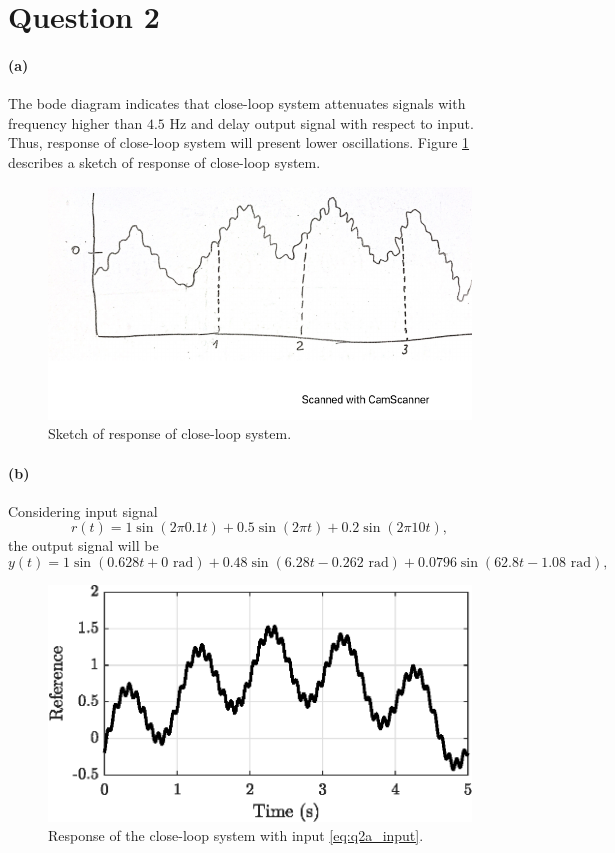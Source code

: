 \section{Question 2}

\paragraph{(a)} The bode diagram indicates that close-loop system attenuates signals with frequency higher than $4.5$ Hz and delay output signal with respect to input. Thus, response of close-loop system will present lower oscillations. Figure \ref{fig:q2_mano} describes a sketch of response of close-loop system. 

\begin{figure}[h!]
\centering
\includegraphics{images/question2/q2_a_mano.pdf}
\caption{Sketch of response of close-loop system.}
\label{fig:q2_mano}
\end{figure}

\paragraph{(b)} Considering input signal
\begin{equation*}
r(t)=1\sin{(2 \pi 0.1 t)} + 0.5\sin{(2 \pi t)} + 0.2\sin{(2 \pi 10 t)},
\label{eq:q2a_input}
\end{equation*}
the output signal will be
\begin{equation*}
y(t) = 1\sin{(0.628 t + 0 \textrm{ rad})} + 0.48\sin{(6.28 t - 0.262 \textrm{ rad})} + 0.0796\sin{(62.8 t-1.08 \textrm{ rad})},
\end{equation*}

\begin{figure}[h!]
\centering
\includegraphics{images/question2/act_2a.eps}
\caption{Response of the close-loop system with input \eqref{eq:q2a_input}.}
\end{figure}

